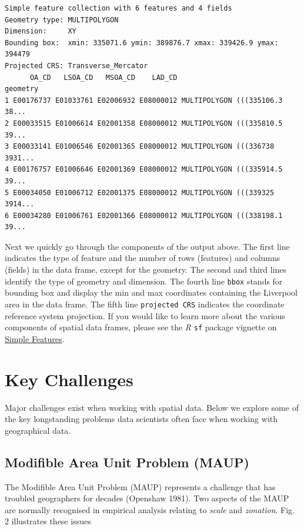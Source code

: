 \documentclass[
  letterpaper,
  DIV=11,
  numbers=noendperiod]{scrreprt}
\begin{document}
\begin{verbatim}
Simple feature collection with 6 features and 4 fields
Geometry type: MULTIPOLYGON
Dimension:     XY
Bounding box:  xmin: 335071.6 ymin: 389876.7 xmax: 339426.9 ymax: 394479
Projected CRS: Transverse_Mercator
      OA_CD   LSOA_CD   MSOA_CD    LAD_CD                       geometry
1 E00176737 E01033761 E02006932 E08000012 MULTIPOLYGON (((335106.3 38...
2 E00033515 E01006614 E02001358 E08000012 MULTIPOLYGON (((335810.5 39...
3 E00033141 E01006546 E02001365 E08000012 MULTIPOLYGON (((336738 3931...
4 E00176757 E01006646 E02001369 E08000012 MULTIPOLYGON (((335914.5 39...
5 E00034050 E01006712 E02001375 E08000012 MULTIPOLYGON (((339325 3914...
6 E00034280 E01006761 E02001366 E08000012 MULTIPOLYGON (((338198.1 39...
\end{verbatim}

Next we quickly go through the components of the output above. The first
line indicates the type of feature and the number of rows (features) and
columns (fields) in the data frame, except for the geometry. The second
and third lines identify the type of geometry and dimension. The fourth
line \texttt{bbox} stands for bounding box and display the min and max
coordinates containing the Liverpool area in the data frame. The fifth
line \texttt{projected\ CRS} indicates the coordinate reference system
projection. If you would like to learn more about the various components
of spatial data frames, please see the \emph{R} \texttt{sf} package
vignette on
\href{https://r-spatial.github.io/sf/articles/sf1.html}{Simple
Features}.

\hypertarget{key-challenges}{%
\section{Key Challenges}\label{key-challenges}}

Major challenges exist when working with spatial data. Below we explore
some of the key longstanding problems data scientists often face when
working with geographical data.

\hypertarget{modifible-area-unit-problem-maup}{%
\subsection{Modifible Area Unit Problem
(MAUP)}\label{modifible-area-unit-problem-maup}}

The Modifible Area Unit Problem (MAUP) represents a challenge that has
troubled geographers for decades (Openshaw 1981). Two aspects of the
MAUP are normally recognised in empirical analysis relating to
\emph{scale} and \emph{zonation}. Fig. 2 illustrates these issues
\end{document}
